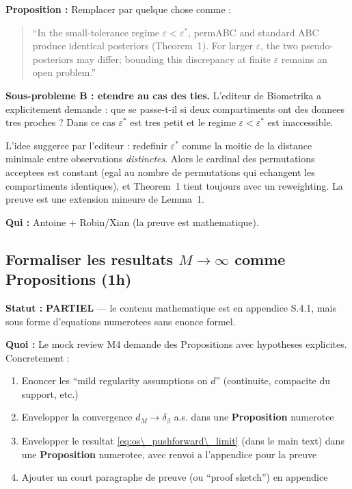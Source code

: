 \documentclass[11pt]{article}
\newcommand{\parti}{\textcolor{partial}{\textbf{PARTIEL}}}
\begin{document}
\textbf{Proposition :} Remplacer par quelque chose comme :
\begin{quote}
``In the small-tolerance regime $\varepsilon < \varepsilon^*$, permABC and standard ABC produce identical posteriors (Theorem~1). For larger $\varepsilon$, the two pseudo-posteriors may differ; bounding this discrepancy at finite $\varepsilon$ remains an open problem.''
\end{quote}

\textbf{Sous-probleme B : etendre au cas des ties.} L'editeur de Biometrika a explicitement demande : que se passe-t-il si deux compartiments ont des donnees tres proches ? Dans ce cas $\varepsilon^*$ est tres petit et le regime $\varepsilon < \varepsilon^*$ est inaccessible.

L'idee suggeree par l'editeur : redefinir $\varepsilon^*$ comme la moitie de la distance minimale entre observations \emph{distinctes}. Alors le cardinal des permutations acceptees est constant (egal au nombre de permutations qui echangent les compartiments identiques), et Theorem~1 tient toujours avec un reweighting. La preuve est une extension mineure de Lemma~1.

\textbf{Qui :} Antoine + Robin/Xian (la preuve est mathematique).

\subsection{Formaliser les resultats $M\to\infty$ comme Propositions (1h)}
\label{sec:minfty}

\textbf{Statut :} \parti{} --- le contenu mathematique est en appendice S.4.1, mais sous forme d'equations numerotees sans enonce formel.

\textbf{Quoi :} Le mock review M4 demande des Propositions avec hypotheses explicites. Concretement :
\begin{enumerate}[nosep]
    \item Enoncer les ``mild regularity assumptions on $d$'' (continuite, compacite du support, etc.)
    \item Envelopper la convergence $d_M \to \delta_\beta$ a.s. dans une \textbf{Proposition} numerotee
    \item Envelopper le resultat \eqref{eq:os\_pushforward\_limit} (dans le main text) dans une \textbf{Proposition} numerotee, avec renvoi a l'appendice pour la preuve
    \item Ajouter un court paragraphe de preuve (ou ``proof sketch'') en appendice
\end{enumerate}
\end{document}
